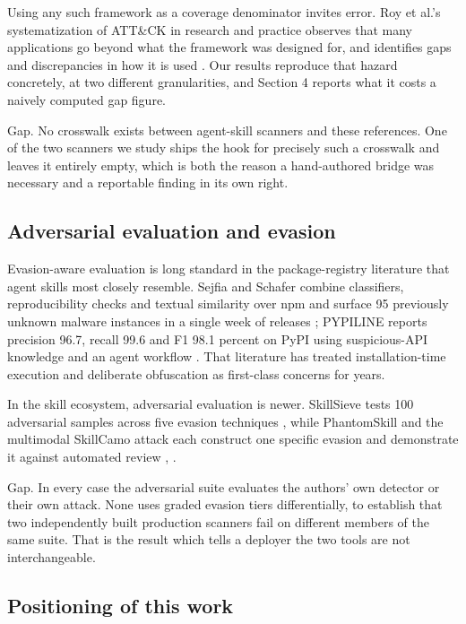 \documentclass[conference]{IEEEtran}
\begin{document}
Using any such framework as a coverage denominator invites error. Roy et al.'s systematization of ATT\&CK in research and practice observes that many applications go beyond what the framework was designed for, and identifies gaps and discrepancies in how it is used \cite{ref18}. Our results reproduce that hazard concretely, at two different granularities, and Section 4 reports what it costs a naively computed gap figure.

Gap. No crosswalk exists between agent-skill scanners and these references. One of the two scanners we study ships the hook for precisely such a crosswalk and leaves it entirely empty, which is both the reason a hand-authored bridge was necessary and a reportable finding in its own right.

\subsection{Adversarial evaluation and evasion}

Evasion-aware evaluation is long standard in the package-registry literature that agent skills most closely resemble. Sejfia and Schafer combine classifiers, reproducibility checks and textual similarity over npm and surface 95 previously unknown malware instances in a single week of releases \cite{ref21}; PYPILINE reports precision 96.7, recall 99.6 and F1 98.1 percent on PyPI using suspicious-API knowledge and an agent workflow \cite{ref22}. That literature has treated installation-time execution and deliberate obfuscation as first-class concerns for years.

In the skill ecosystem, adversarial evaluation is newer. SkillSieve tests 100 adversarial samples across five evasion techniques \cite{ref11}, while PhantomSkill and the multimodal SkillCamo attack each construct one specific evasion and demonstrate it against automated review \cite{ref12}, \cite{ref13}.

Gap. In every case the adversarial suite evaluates the authors' own detector or their own attack. None uses graded evasion tiers differentially, to establish that two independently built production scanners fail on different members of the same suite. That is the result which tells a deployer the two tools are not interchangeable.

\subsection{Positioning of this work}
\end{document}
